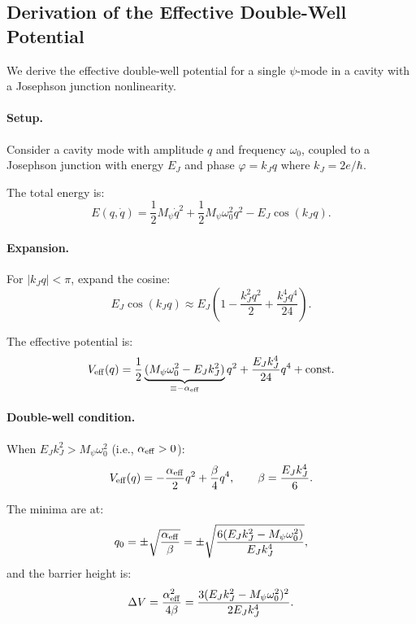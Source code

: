 \documentclass[12pt,a4paper,twoside]{article}
\begin{document}
\begin{appendices}

\section{Derivation of the Effective Double-Well Potential}\label{app:double_well}

We derive the effective double-well potential for a single $\psi$-mode in a cavity with a Josephson junction nonlinearity.

\paragraph{Setup.} Consider a cavity mode with amplitude $q$ and frequency $\omega_0$, coupled to a Josephson junction with energy $E_J$ and phase $\varphi = k_J q$ where $k_J = 2e/\hbar$.

The total energy is:
\begin{equation}
E(q, \dot{q}) = \frac{1}{2}M_\psi\dot{q}^2 + \frac{1}{2}M_\psi\omega_0^2 q^2 - E_J\cos(k_J q).
\end{equation}

\paragraph{Expansion.} For $|k_J q| < \pi$, expand the cosine:
\begin{equation}
E_J\cos(k_J q) \approx E_J\left(1 - \frac{k_J^2 q^2}{2} + \frac{k_J^4 q^4}{24}\right).
\end{equation}

The effective potential is:
\begin{equation}
V_{\rm eff}(q) = \frac{1}{2}\underbrace{(M_\psi\omega_0^2 - E_J k_J^2)}_{\equiv -\alpha_{\rm eff}} q^2 + \frac{E_J k_J^4}{24}q^4 + \text{const.}
\end{equation}

\paragraph{Double-well condition.} When $E_J k_J^2 > M_\psi\omega_0^2$ (i.e., $\alpha_{\rm eff} > 0$):
\begin{equation}
V_{\rm eff}(q) = -\frac{\alpha_{\rm eff}}{2}q^2 + \frac{\beta}{4}q^4, \qquad \beta = \frac{E_J k_J^4}{6}.
\end{equation}

The minima are at:
\begin{equation}
q_0 = \pm\sqrt{\frac{\alpha_{\rm eff}}{\beta}} = \pm\sqrt{\frac{6(E_J k_J^2 - M_\psi\omega_0^2)}{E_J k_J^4}},
\end{equation}
and the barrier height is:
\begin{equation}
\Delta V = \frac{\alpha_{\rm eff}^2}{4\beta} = \frac{3(E_J k_J^2 - M_\psi\omega_0^2)^2}{2E_J k_J^4}.
\end{equation}


\end{appendices}
\end{document}

